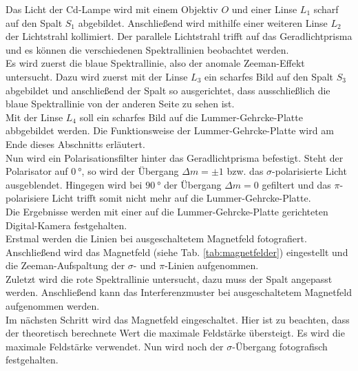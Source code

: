 Das Licht der Cd-Lampe wird mit einem Objektiv $O$ und einer Linse $L_1$ scharf auf den Spalt $S_1$ abgebildet.
Anschließend wird mithilfe einer weiteren Linse $L_2$ der Lichtstrahl kollimiert.
Der parallele Lichtstrahl trifft auf das Geradlichtprisma und es können die verschiedenen Spektrallinien beobachtet werden.
\\
Es wird zuerst die blaue Spektrallinie, also der anomale Zeeman-Effekt untersucht.
Dazu wird zuerst mit der Linse $L_3$ ein scharfes Bild auf den Spalt $S_3$ abgebildet und anschließend der Spalt so ausgerichtet, dass ausschließlich die blaue Spektrallinie von der anderen Seite zu sehen ist.
\\
Mit der Linse $L_4$ soll ein scharfes Bild auf die Lummer-Gehrcke-Platte abbgebildet werden.
Die Funktionsweise der Lummer-Gehrcke-Platte wird am Ende dieses Abschnitts erläutert.
\\
Nun wird ein Polarisationsfilter hinter das Geradlichtprisma befestigt.
Steht der Polarisator auf $\SI{0}{\degree}$, so wird der Übergang $\Delta m = \pm 1$ bzw. das $\sigma$-polarisierte Licht ausgeblendet.
Hingegen wird bei $\SI{90}{\degree}$ der Übergang $\Delta m = 0$ gefiltert und das $\pi$-polarisiere Licht trifft somit nicht mehr auf die Lummer-Gehrcke-Platte.
\\
Die Ergebnisse werden mit einer auf die Lummer-Gehrcke-Platte gerichteten Digital-Kamera festgehalten.
\\
Erstmal werden die Linien bei ausgeschaltetem Magnetfeld fotografiert.
Anschließend wird das Magnetfeld (siehe Tab. \ref{tab:magnetfelder}) eingestellt und die Zeeman-Aufspaltung der $\sigma$- und $\pi$-Linien aufgenommen.
\\
Zuletzt wird die rote Spektrallinie untersucht, dazu muss der Spalt angepasst werden.
Anschließend kann das Interferenzmuster bei ausgeschaltetem Magnetfeld aufgenommen werden.
\\
Im nächsten Schritt wird das Magnetfeld eingeschaltet.
Hier ist zu beachten, dass der theoretisch berechnete Wert die maximale Feldstärke übersteigt.
Es wird die maximale Feldstärke verwendet.
Nun wird noch der $\sigma$-Übergang fotografisch festgehalten.